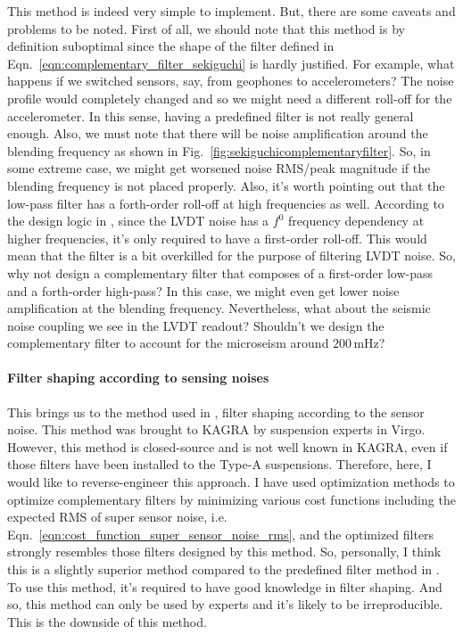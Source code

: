 This method is indeed very simple to implement.
But, there are some caveats and problems to be noted.
First of all, we should note that this method is by definition suboptimal since the shape of the filter defined in Eqn.~\eqref{eqn:complementary_filter_sekiguchi} is hardly justified.
For example, what happens if we switched sensors, say, from geophones to accelerometers?
The noise profile would completely changed and so we might need a different roll-off for the accelerometer.
In this sense, having a predefined filter is not really general enough.
Also, we must note that there will be noise amplification around the blending frequency as shown in Fig.~\ref{fig:sekiguchicomplementaryfilter}.
So, in some extreme case, we might get worsened noise RMS/peak magnitude if the blending frequency is not placed properly.
Also, it's worth pointing out that the low-pass filter has a forth-order roll-off at high frequencies as well.
According to the design logic in \cite{Sekiguchi:2016bmv}, since the LVDT noise has a $f^{0}$ frequency dependency at higher frequencies, it's only required to have a first-order roll-off.
This would mean that the filter is a bit overkilled for the purpose of filtering LVDT noise.
So, why not design a complementary filter that composes of a first-order low-pass and a forth-order high-pass?
In this case, we might even get lower noise amplification at the blending frequency.
Nevertheless, what about the seismic noise coupling we see in the LVDT readout?
Shouldn't we design the complementary filter to account for the microseism around $200\,\mathrm{mHz}$?

\paragraph{Filter shaping according to sensing noises}
This brings us to the method used in \cite{low_frequency_optimization_and_performance_of_advanced_virgo_seismic_isolation_system}, filter shaping according to the sensor noise.
This method was brought to KAGRA by suspension experts in Virgo.
However, this method is closed-source and is not well known in KAGRA, even if those filters have been installed to the Type-A suspensions.
Therefore, here, I would like to reverse-engineer this approach.
I have used optimization methods to optimize complementary filters by minimizing various cost functions including the expected RMS of super sensor noise, i.e. Eqn.~\eqref{eqn:cost_function_super_sensor_noise_rms}, and the optimized filters strongly resembles those filters designed by this method.
So, personally, I think this is a slightly superior method compared to the predefined filter method in \cite{Sekiguchi:2016bmv, Heijningen:2018evm}.
To use this method, it's required to have good knowledge in filter shaping.
And so, this method can only be used by experts and it's likely to be irreproducible.
This is the downside of this method.

